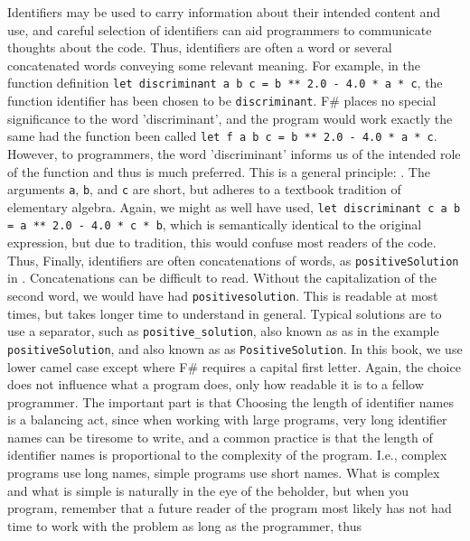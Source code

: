\documentclass[fsharpnotes.tex]{subfiles}
\begin{document}
Identifiers may be used to carry information about their intended content and use, and careful selection of identifiers can aid programmers to communicate thoughts about the code. Thus, identifiers are often a word or several concatenated words conveying some relevant meaning. For example, in the function definition \lstinline{let discriminant a b c = b ** 2.0 - 4.0 * a * c}, the function identifier has been chosen to be \lstinline{discriminant}. F\# places no special significance to the word 'discriminant', and the program would work exactly the same had the function been called \lstinline{let f a b c = b ** 2.0 - 4.0 * a * c}. However, to programmers, the word 'discriminant' informs us of the intended role of the function and thus is much preferred. This is a general principle: . The arguments \lstinline{a}, \lstinline{b}, and \lstinline{c} are short, but adheres to a textbook tradition of elementary algebra. Again, we might as well have used, \lstinline{let discriminant c a b = a ** 2.0 - 4.0 * c * b}, which is semantically identical to the original expression, but due to tradition, this would confuse most readers of the code. Thus,  Finally, identifiers are often concatenations of words, as \lstinline{positiveSolution} in . Concatenations can be difficult to read. Without the capitalization of the second word, we would have had \lstinline{positivesolution}. This is readable at most times, but takes longer time to understand in general. Typical solutions are to use a separator, such as \lstinline{positive_solution},  also known as  as in the example \lstinline{positiveSolution}, and  also known as  as \lstinline{PositiveSolution}. In this book, we use lower camel case except where F\# requires a capital first letter. Again, the choice does not influence what a program does, only how readable it is to a fellow programmer. The important part is that  Choosing the length of identifier names is a balancing act, since when working with large programs, very long identifier names can be tiresome to write, and a common practice is that the length of identifier names is proportional to the complexity of the program. I.e., complex programs use long names, simple programs use short names. What is complex and what is simple is naturally in the eye of the beholder, but when you program, remember that a future reader of the program most likely has not had time to work with the problem as long as the programmer, thus 
\end{document}
